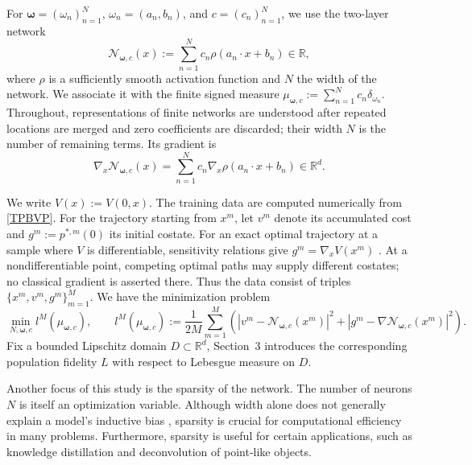 \documentclass[11pt]{amsart}
\theoremstyle{definition}
\theoremstyle{remark}
\begin{document}
For
$\boldsymbol\omega=(\omega_n)_{n=1}^N$,
$\omega_n=(a_n,b_n)$, and $c=(c_n)_{n=1}^N$, we use the two-layer network
\begin{equation}
	\label{eq:network}
	\mathcal{N}_{\boldsymbol\omega,c}(x)
	:=\sum_{n=1}^N c_n\rho(a_n\cdot x+b_n)\in\mathbb R,
\end{equation}
where $\rho$ is a sufficiently smooth activation function and $N$ the width of the network.
We associate it with the finite signed measure
$\mu_{\boldsymbol\omega,c}:=\sum_{n=1}^N c_n\delta_{\omega_n}$.
Throughout, representations of finite networks are understood after repeated
locations are merged and zero coefficients are discarded; their width $N$ is
the number of remaining terms.
Its gradient is
\begin{equation*}
	\nabla_x\mathcal{N}_{\boldsymbol\omega,c}(x)
	=\sum_{n=1}^N c_n\nabla_x\rho(a_n\cdot x+b_n)\in\mathbb R^d.
\end{equation*}

We write $V(x):=V(0,x)$.
The training data are computed numerically from \eqref{TPBVP}. For the trajectory
starting from $x^m$, let $v^m$ denote its accumulated cost and
$g^m:=p^{*,m}(0)$ its initial costate. For an exact optimal trajectory at a sample
where $V$ is differentiable, sensitivity relations give $g^m=\nabla_x V(x^m)$
\cite{cristiani2010initialization,cannarsa1991some,clarke1987relationship}.
At a nondifferentiable point, competing optimal paths may supply different costates;
no classical gradient is asserted there. Thus the data consist of
triples $\{x^m,v^m,g^m\}_{m=1}^M$.
We have the minimization problem
\begin{equation*}
\min_{N,\boldsymbol\omega,c}l^M(\mu_{\boldsymbol\omega,c}),
\qquad
l^M(\mu_{\boldsymbol\omega,c}):=
\frac{1}{2M}\sum_{m=1}^M
\left(
|v^m-\mathcal N_{\boldsymbol\omega,c}(x^m)|^2
+|g^m-\nabla\mathcal N_{\boldsymbol\omega,c}(x^m)|^2
\right).
\end{equation*}
Fix a bounded Lipschitz domain $D\subset\mathbb R^d$, 
Section~3 introduces the corresponding population fidelity $L$ with respect
to Lebesgue measure on $D$.


Another focus of this study is the sparsity of the network. 
The number of neurons $N$ is itself an optimization variable.
Although width alone does not generally explain a model's inductive bias
\cite{neyshabur2014search}, sparsity is crucial for computational efficiency
in many problems.
Furthermore, sparsity is useful for certain applications, such as knowledge distillation and deconvolution of point-like objects.
\end{document}
